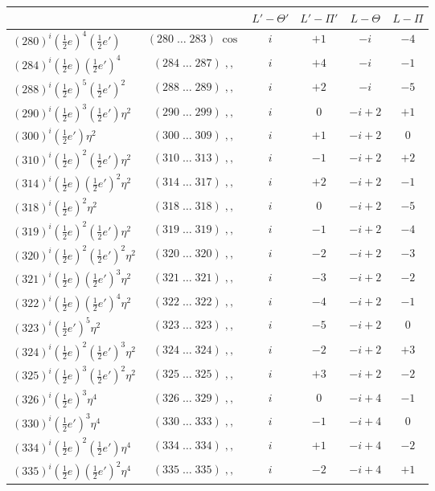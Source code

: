 \documentclass[11pt]{article}
\begin{document}
\begin{center}
\begin{tabular}{|l|c|c|c|c|c|}
\hline
 & & $L'-\Theta'$ & $L'-\Pi'$ & $L-\Theta$ & $L-\Pi$ \\
\hline
$(280)^i(\tfrac{1}{2}e)^4(\tfrac{1}{2}e')$ & $(280\;\ldots\;283)\;\cos$ & $i$ & $+1$ & $-i$ & $-4$ \\
$(284)^i(\tfrac{1}{2}e)(\tfrac{1}{2}e')^4$ & $(284\;\ldots\;287)\;,,$ & $i$ & $+4$ & $-i$ & $-1$ \\
$(288)^i(\tfrac{1}{2}e)^5(\tfrac{1}{2}e')^2$ & $(288\;\ldots\;289)\;,,$ & $i$ & $+2$ & $-i$ & $-5$ \\
$(290)^i(\tfrac{1}{2}e)^3(\tfrac{1}{2}e')\eta^2$ & $(290\;\ldots\;299)\;,,$ & $i$ & $0$ & $-i+2$ & $+1$ \\
$(300)^i(\tfrac{1}{2}e')\eta^2$ & $(300\;\ldots\;309)\;,,$ & $i$ & $+1$ & $-i+2$ & $0$ \\
$(310)^i(\tfrac{1}{2}e)^2(\tfrac{1}{2}e')\eta^2$ & $(310\;\ldots\;313)\;,,$ & $i$ & $-1$ & $-i+2$ & $+2$ \\
$(314)^i(\tfrac{1}{2}e)(\tfrac{1}{2}e')^2\eta^2$ & $(314\;\ldots\;317)\;,,$ & $i$ & $+2$ & $-i+2$ & $-1$ \\
$(318)^i(\tfrac{1}{2}e)^2\eta^2$ & $(318\;\ldots\;318)\;,,$ & $i$ & $0$ & $-i+2$ & $-5$ \\
$(319)^i(\tfrac{1}{2}e)^2(\tfrac{1}{2}e')\eta^2$ & $(319\;\ldots\;319)\;,,$ & $i$ & $-1$ & $-i+2$ & $-4$ \\
$(320)^i(\tfrac{1}{2}e)^2(\tfrac{1}{2}e')^2\eta^2$ & $(320\;\ldots\;320)\;,,$ & $i$ & $-2$ & $-i+2$ & $-3$ \\
$(321)^i(\tfrac{1}{2}e)(\tfrac{1}{2}e')^3\eta^2$ & $(321\;\ldots\;321)\;,,$ & $i$ & $-3$ & $-i+2$ & $-2$ \\
$(322)^i(\tfrac{1}{2}e)(\tfrac{1}{2}e')^4\eta^2$ & $(322\;\ldots\;322)\;,,$ & $i$ & $-4$ & $-i+2$ & $-1$ \\
$(323)^i(\tfrac{1}{2}e')^5\eta^2$ & $(323\;\ldots\;323)\;,,$ & $i$ & $-5$ & $-i+2$ & $0$ \\
$(324)^i(\tfrac{1}{2}e)^2(\tfrac{1}{2}e')^3\eta^2$ & $(324\;\ldots\;324)\;,,$ & $i$ & $-2$ & $-i+2$ & $+3$ \\
$(325)^i(\tfrac{1}{2}e)^3(\tfrac{1}{2}e')^2\eta^2$ & $(325\;\ldots\;325)\;,,$ & $i$ & $+3$ & $-i+2$ & $-2$ \\
$(326)^i(\tfrac{1}{2}e)^3\eta^4$ & $(326\;\ldots\;329)\;,,$ & $i$ & $0$ & $-i+4$ & $-1$ \\
$(330)^i(\tfrac{1}{2}e')^3\eta^4$ & $(330\;\ldots\;333)\;,,$ & $i$ & $-1$ & $-i+4$ & $0$ \\
$(334)^i(\tfrac{1}{2}e)^2(\tfrac{1}{2}e')\eta^4$ & $(334\;\ldots\;334)\;,,$ & $i$ & $+1$ & $-i+4$ & $-2$ \\
$(335)^i(\tfrac{1}{2}e)(\tfrac{1}{2}e')^2\eta^4$ & $(335\;\ldots\;335)\;,,$ & $i$ & $-2$ & $-i+4$ & $+1$ \\
\hline
\end{tabular}
\end{center}
\end{document}
